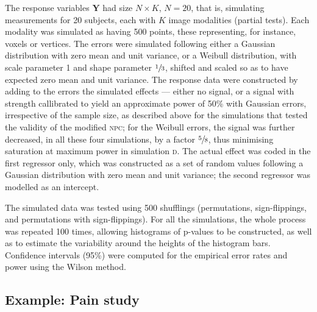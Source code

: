 The response variables $\mathbf{Y}$ had size $N \times K$, $N=20$, that is, simulating measurements for 20 subjects, each with $K$ image modalities (partial tests). Each modality was simulated as having 500 points, these representing, for instance, voxels or vertices. The errors were simulated following either a Gaussian distribution with zero mean and unit variance, or a Weibull distribution, with scale parameter 1 and shape parameter $\sfrac{1}{3}$, shifted and scaled so as to have expected zero mean and unit variance. The response data were constructed by adding to the errors the simulated effects --- either no signal, or a signal with strength callibrated to yield an approximate power of 50\% with Gaussian errors, irrespective of the sample size, as described above for the simulations that tested the validity of the modified \textsc{npc}; for the Weibull errors, the signal was further decreased, in all these four simulations, by a factor $\sfrac{5}{8}$, thus minimising saturation at maximum power in simulation \textsc{d}. The actual effect was coded in the first regressor only, which was constructed as a set of random values following a Gaussian distribution with zero mean and unit variance; the second regressor was modelled as an intercept.

The simulated data was tested using 500 shufflings (permutations, sign-flippings, and permutations with sign-flippings). For all the simulations, the whole process was repeated 100 times, allowing histograms of p-values to be constructed, as well as to estimate the variability around the heights of the histogram bars. Confidence intervals (95\%) were computed for the empirical error rates and power using the Wilson method.

\subsection{Example: Pain study}

